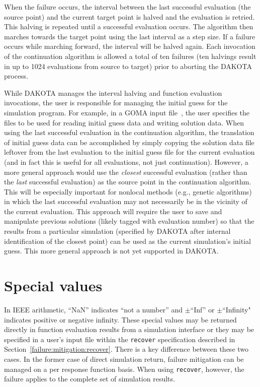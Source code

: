 When the failure occurs, the interval between the last successful
evaluation (the source point) and the current target point is halved
and the evaluation is retried. This halving is repeated until a
successful evaluation occurs. The algorithm then marches towards the
target point using the last interval as a step size. If a failure
occurs while marching forward, the interval will be halved again. Each
invocation of the continuation algorithm is allowed a total of ten
failures (ten halvings result in up to 1024 evaluations from source to
target) prior to aborting the DAKOTA process.

While DAKOTA manages the interval halving and function evaluation
invocations, the user is responsible for managing the initial guess
for the simulation program. For example, in a GOMA input
file~\cite{Sch95}, the user specifies the files to be used for reading
initial guess data and writing solution data. When using the last
successful evaluation in the continuation algorithm, the translation
of initial guess data can be accomplished by simply copying the
solution data file leftover from the last evaluation to the initial
guess file for the current evaluation (and in fact this is useful for
all evaluations, not just continuation). However, a more general
approach would use the \emph{closest} successful evaluation (rather
than the \emph{last} successful evaluation) as the source point in the
continuation algorithm. This will be especially important for nonlocal
methods (e.g., genetic algorithms) in which the last successful
evaluation may not necessarily be in the vicinity of the current
evaluation. This approach will require the user to save and manipulate
previous solutions (likely tagged with evaluation number) so that the
results from a particular simulation (specified by DAKOTA after
internal identification of the closest point) can be used as the
current simulation's initial guess.  This more general approach is not
yet supported in DAKOTA.

\section{Special values} \label{failure:special}

In IEEE arithmetic, ``NaN'' indicates ``not a number'' and
$\pm$``Inf'' or $\pm$``Infinity" indicates positive or negative infinity.  These special
values may be returned directly in function evaluation results from a
simulation interface or they may be specified in a user's input file
within the \texttt{recover} specification described in
Section~\ref{failure:mitigation:recover}.  There is a key difference
between these two cases.  In the former case of direct simulation
return, failure mitigation can be managed on a per response function
basis.  When using \texttt{recover}, however, the failure applies to
the complete set of simulation results.

